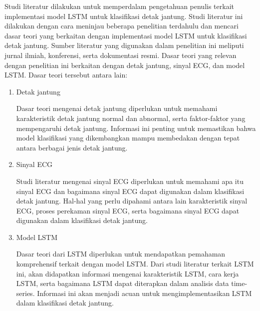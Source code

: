 Studi literatur dilakukan untuk memperdalam pengetahuan penulis terkait implementasi model LSTM untuk klasifikasi detak jantung.
Studi literatur ini dilakukan dengan cara meninjau beberapa penelitian terdahulu dan mencari dasar teori yang berkaitan dengan implementasi model LSTM untuk klasifikasi detak jantung.
Sumber literatur yang digunakan dalam penelitian ini meliputi jurnal ilmiah, konferensi, serta dokumentasi resmi.
Dasar teori yang relevan dengan penelitian ini berkaitan dengan detak jantung, sinyal ECG, dan model LSTM.
Dasar teori tersebut antara lain:
\begin{enumerate}
	\item Detak jantung

		Dasar teori mengenai detak jantung diperlukan untuk memahami karakteristik detak jantung normal dan abnormal, serta faktor-faktor yang mempengaruhi detak jantung.
		Informasi ini penting untuk memastikan bahwa model klasifikasi yang dikembangkan mampu membedakan dengan tepat antara berbagai jenis detak jantung.
		
	\item Sinyal ECG

		Studi literatur mengenai sinyal ECG diperlukan untuk memahami apa itu sinyal ECG dan bagaimana sinyal ECG dapat digunakan dalam klasifikasi detak jantung.
		Hal-hal yang perlu dipahami antara lain karakteristik sinyal ECG, proses perekaman sinyal ECG, serta bagaimana sinyal ECG dapat digunakan dalam klasifikasi detak jantung.

	\item Model LSTM

		Dasar teori dari LSTM diperlukan untuk mendapatkan pemahaman komprehensif terkait dengan model LSTM.
		Dari studi literatur terkait LSTM ini, akan didapatkan informasi mengenai karakteristik LSTM, cara kerja LSTM, serta bagaimana LSTM dapat diterapkan dalam analisis data time-series.
		Informasi ini akan menjadi acuan untuk mengimplementasikan LSTM dalam klasifikasi detak jantung.

\end{enumerate}



